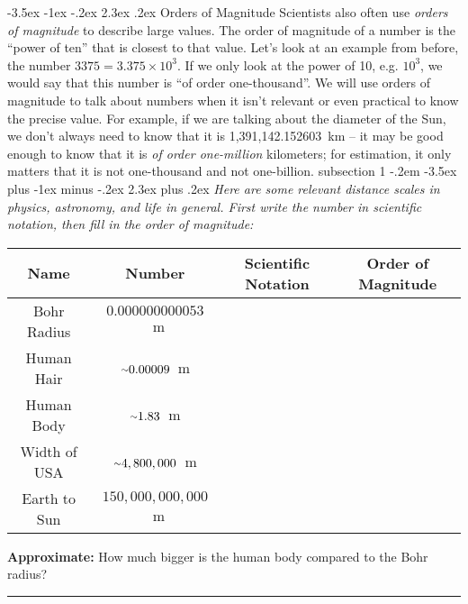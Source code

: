 \documentclass[12pt]{article}
\makeatletter
\newcommand{\apwsim}{\raisebox{0.2ex}{\scriptsize$\sim$\normalsize}}
\newenvironment{problem}{\@startsection
       {subsection}
       {1}
       {-.2em}
       {-3.5ex plus -1ex minus -.2ex}
       {2.3ex plus .2ex}
       {\pagebreak[3]%
       \normalsize\bf\noindent{Problem }
       }
       }
       {%
       }
\renewcommand\section{\@startsection{section}{1}{\z@}%
                                  {-3.5ex \@plus -1ex \@minus -.2ex}%
                                  {2.3ex \@plus.2ex}%
                                  {\normalfont\large\bfseries}}
\makeatother
\begin{document}
%
%
\section{Orders of Magnitude}
\indent\indent Scientists also often use \emph{orders of magnitude} to describe large values. The order of magnitude of a number is the ``power of ten'' that is closest to that value. Let's look at an example from before, the number $3375 = 3.375\times10^3$. If we only look at the power of 10, e.g. $10^3$, we would say that this number is ``of order one-thousand''. We will use orders of magnitude to talk about numbers when it isn't relevant or even practical to know the precise value. For example, if we are talking about the diameter of the Sun, we don't always need to know that it is 1,391,142.152603~km -- it may be good enough to know that it is \emph{of order one-million} kilometers; for estimation, it only matters that it is not one-thousand and not one-billion.
\clearpage
\begin{problem}{ }
\emph{Here are some relevant distance scales in physics, astronomy, and life in general. First write the number in scientific notation, then fill in the order of magnitude:}
\begin{center}
	\def\arraystretch{1.5}
	\begin{tabular}{| c | c | c | c |}
		\hline
		\textbf{Name} & \textbf{Number} & \textbf{Scientific Notation} & \textbf{Order of Magnitude} \\ \hline 
		Bohr Radius & $0.000000000053$~m &  &  \\ \hline 
		Human Hair & $\apwsim0.00009$~m &  &  \\ \hline 
		Human Body & $\apwsim1.83$~m &  &  \\ \hline 
		Width of USA & $\apwsim4,800,000$~m &  &  \\ \hline
		Earth to Sun & $150,000,000,000$~m &  &  \\ \hline
	\end{tabular}\linebreak\linebreak
	
	\noindent\textbf{Approximate:} How much bigger is the human body compared to the Bohr radius?\linebreak\linebreak\linebreak
	 \rule{15cm}{0.75pt}\linebreak
	 
\end{center}
\end{problem}
\end{document}
